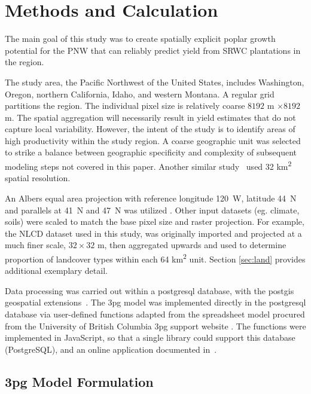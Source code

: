 \documentclass[preprint,review,12pt]{elsarticle}
\begin{document}
\section{Methods and Calculation}

The main goal of this study was to create spatially explicit poplar
growth potential for the \ac{PNW} that can reliably predict yield
from \ac{SRWC} plantations in the region.

The study area, the Pacific Northwest of the United States, includes
Washington, Oregon, northern California, Idaho, and western Montana.
A regular grid partitions the region.  The individual pixel size is
relatively coarse $8192$ m $ \times 8192$ m. The spatial aggregation
will necessarily result in yield estimates that do not capture local
variability. However, the intent of the study is to identify areas of
high productivity within the study region. A coarse geographic unit
was selected to strike a balance between geographic specificity and
complexity of subsequent modeling steps not covered in this
paper. Another similar study~\cite{Headlee2012} used 32
km\textsuperscript{2} spatial resolution.

An Albers equal area projection with reference longitude 120\degree~W,
latitude 44\degree~N and parallels at 41\degree~N and 47\degree~N was
utilized \cite{SRORG7260}.
Other input datasets (eg. climate, soils) were scaled to match the base
pixel size and raster projection. For example, the \ac{NLCD} dataset
used in this study, was originally imported and projected at a much
finer scale, $32 \times 32$ m, then aggregated upwards and used to determine
proportion of landcover types within each 64 km\textsuperscript{2} unit. Section \ref{sec:land} provides additional exemplary detail.

Data processing was carried out within a postgresql database, with the
postgis geospatial extensions~\cite{pgsql,Holl2009,postgis}.  The
\ac{3pg} model was implemented directly in the postgresql database via
user-defined functions adapted from the spreadsheet model procured
from the University of British Columbia \ac{3pg} support website
\cite{FacultyofForestry2015}. The functions were implemented in JavaScript\texttrademark, so that a single library
could support this database (PostgreSQL), and an online application
documented in~\cite{Prilepova2014}.

\subsection{\acs{3pg} Model Formulation}
\label{sec:3pg}
\end{document}
